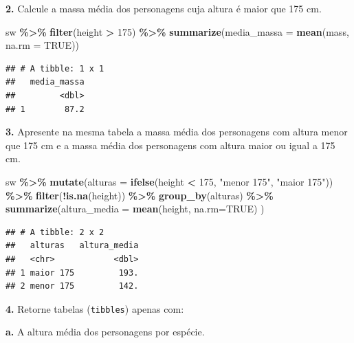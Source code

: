 \documentclass[
]{book}
\newenvironment{Shaded}{\begin{snugshade}}{\end{snugshade}}
\newcommand{\AttributeTok}[1]{\textcolor[rgb]{0.13,0.29,0.53}{#1}}
\newcommand{\ConstantTok}[1]{\textcolor[rgb]{0.56,0.35,0.01}{#1}}
\newcommand{\DecValTok}[1]{\textcolor[rgb]{0.00,0.00,0.81}{#1}}
\newcommand{\FunctionTok}[1]{\textcolor[rgb]{0.13,0.29,0.53}{\textbf{#1}}}
\newcommand{\NormalTok}[1]{#1}
\newcommand{\SpecialCharTok}[1]{\textcolor[rgb]{0.81,0.36,0.00}{\textbf{#1}}}
\newcommand{\StringTok}[1]{\textcolor[rgb]{0.31,0.60,0.02}{#1}}
\begin{document}
\textbf{2.} Calcule a massa média dos personagens cuja altura é maior que 175
cm.

\begin{Shaded}
\begin{Highlighting}[]
\NormalTok{sw }\SpecialCharTok{\%\textgreater{}\%} 
  \FunctionTok{filter}\NormalTok{(height }\SpecialCharTok{\textgreater{}} \DecValTok{175}\NormalTok{) }\SpecialCharTok{\%\textgreater{}\%} 
  \FunctionTok{summarize}\NormalTok{(}\AttributeTok{media\_massa =} \FunctionTok{mean}\NormalTok{(mass, }\AttributeTok{na.rm =} \ConstantTok{TRUE}\NormalTok{))}
\end{Highlighting}
\end{Shaded}

\begin{verbatim}
## # A tibble: 1 x 1
##   media_massa
##         <dbl>
## 1        87.2
\end{verbatim}

\textbf{3.} Apresente na mesma tabela a massa média dos personagens com
altura menor que 175 cm e a massa média dos personagens com altura maior
ou igual a 175 cm.

\begin{Shaded}
\begin{Highlighting}[]
\NormalTok{sw }\SpecialCharTok{\%\textgreater{}\%} 
  \FunctionTok{mutate}\NormalTok{(}\AttributeTok{alturas =} \FunctionTok{ifelse}\NormalTok{(height }\SpecialCharTok{\textless{}} \DecValTok{175}\NormalTok{, }\StringTok{"menor 175"}\NormalTok{, }\StringTok{"maior 175"}\NormalTok{)) }\SpecialCharTok{\%\textgreater{}\%}
  \FunctionTok{filter}\NormalTok{(}\SpecialCharTok{!}\FunctionTok{is.na}\NormalTok{(height)) }\SpecialCharTok{\%\textgreater{}\%} 
  \FunctionTok{group\_by}\NormalTok{(alturas) }\SpecialCharTok{\%\textgreater{}\%} 
  \FunctionTok{summarize}\NormalTok{(}\AttributeTok{altura\_media =} \FunctionTok{mean}\NormalTok{(height, }\AttributeTok{na.rm=}\ConstantTok{TRUE}\NormalTok{)}
\NormalTok{  )}
\end{Highlighting}
\end{Shaded}

\begin{verbatim}
## # A tibble: 2 x 2
##   alturas   altura_media
##   <chr>            <dbl>
## 1 maior 175         193.
## 2 menor 175         142.
\end{verbatim}

\textbf{4.} Retorne tabelas (\texttt{tibbles}) apenas com:

\textbf{a.} A altura média dos personagens por espécie.
\end{document}
